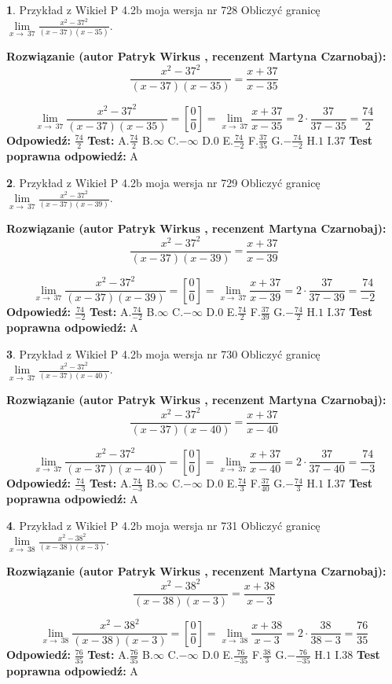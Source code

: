 \documentclass[12pt, a4paper]{article}
\theoremstyle{definition} %
\newtheorem{zad}{}
\newcommand{\zadStart}[1]{\begin{zad}#1\newline}
\newcommand{\zadStop}{\end{zad}}
\newcommand{\rozwStart}[2]{\noindent \textbf{Rozwiązanie (autor #1 , recenzent #2): }\newline}
\newcommand{\rozwStop}{\newline}
\newcommand{\odpStart}{\noindent \textbf{Odpowiedź:}\newline}
\newcommand{\odpStop}{\newline}
\newcommand{\testStart}{\noindent \textbf{Test:}\newline}
\newcommand{\testStop}{\newline}
\newcommand{\kluczStart}{\noindent \textbf{Test poprawna odpowiedź:}\newline}
\newcommand{\kluczStop}{\newline}
\begin{document}
\zadStart{Przykład z Wikieł P 4.2b moja wersja nr 728}
Obliczyć granicę $\lim\limits_{x\to\ 37}\frac{x^{2}-37^{2}}{(x-37)(x-35)}$.
\zadStop
\rozwStart{Patryk Wirkus}{Martyna Czarnobaj}
$$\frac{x^{2}-37^{2}}{(x-37)(x-35)}=\frac{x+37}{x-35}$$

$$\lim\limits_{x\to\ 37}\frac{x^{2}-37^{2}}{(x-37)(x-35)}=[\frac{0}{0}]=\lim\limits_{x\to\ 37}\frac{x+37}{x-35}=2 \cdot \frac{37}{37-35} = \frac{74}{2}$$
\rozwStop
\odpStart
$\frac{74}{2}$
\odpStop
\testStart
A.$\frac{74}{2}$
B.$\infty$
C.$-\infty$
D.$0$
E.$\frac{74}{-2}$
F.$\frac{37}{35}$
G.$-\frac{74}{-2}$
H.$1$
I.$37$
\testStop
\kluczStart
A
\kluczStop



\zadStart{Przykład z Wikieł P 4.2b moja wersja nr 729}
Obliczyć granicę $\lim\limits_{x\to\ 37}\frac{x^{2}-37^{2}}{(x-37)(x-39)}$.
\zadStop
\rozwStart{Patryk Wirkus}{Martyna Czarnobaj}
$$\frac{x^{2}-37^{2}}{(x-37)(x-39)}=\frac{x+37}{x-39}$$

$$\lim\limits_{x\to\ 37}\frac{x^{2}-37^{2}}{(x-37)(x-39)}=[\frac{0}{0}]=\lim\limits_{x\to\ 37}\frac{x+37}{x-39}=2 \cdot \frac{37}{37-39} = \frac{74}{-2}$$
\rozwStop
\odpStart
$\frac{74}{-2}$
\odpStop
\testStart
A.$\frac{74}{-2}$
B.$\infty$
C.$-\infty$
D.$0$
E.$\frac{74}{2}$
F.$\frac{37}{39}$
G.$-\frac{74}{2}$
H.$1$
I.$37$
\testStop
\kluczStart
A
\kluczStop



\zadStart{Przykład z Wikieł P 4.2b moja wersja nr 730}
Obliczyć granicę $\lim\limits_{x\to\ 37}\frac{x^{2}-37^{2}}{(x-37)(x-40)}$.
\zadStop
\rozwStart{Patryk Wirkus}{Martyna Czarnobaj}
$$\frac{x^{2}-37^{2}}{(x-37)(x-40)}=\frac{x+37}{x-40}$$

$$\lim\limits_{x\to\ 37}\frac{x^{2}-37^{2}}{(x-37)(x-40)}=[\frac{0}{0}]=\lim\limits_{x\to\ 37}\frac{x+37}{x-40}=2 \cdot \frac{37}{37-40} = \frac{74}{-3}$$
\rozwStop
\odpStart
$\frac{74}{-3}$
\odpStop
\testStart
A.$\frac{74}{-3}$
B.$\infty$
C.$-\infty$
D.$0$
E.$\frac{74}{3}$
F.$\frac{37}{40}$
G.$-\frac{74}{3}$
H.$1$
I.$37$
\testStop
\kluczStart
A
\kluczStop



\zadStart{Przykład z Wikieł P 4.2b moja wersja nr 731}
Obliczyć granicę $\lim\limits_{x\to\ 38}\frac{x^{2}-38^{2}}{(x-38)(x-3)}$.
\zadStop
\rozwStart{Patryk Wirkus}{Martyna Czarnobaj}
$$\frac{x^{2}-38^{2}}{(x-38)(x-3)}=\frac{x+38}{x-3}$$

$$\lim\limits_{x\to\ 38}\frac{x^{2}-38^{2}}{(x-38)(x-3)}=[\frac{0}{0}]=\lim\limits_{x\to\ 38}\frac{x+38}{x-3}=2 \cdot \frac{38}{38-3} = \frac{76}{35}$$
\rozwStop
\odpStart
$\frac{76}{35}$
\odpStop
\testStart
A.$\frac{76}{35}$
B.$\infty$
C.$-\infty$
D.$0$
E.$\frac{76}{-35}$
F.$\frac{38}{3}$
G.$-\frac{76}{-35}$
H.$1$
I.$38$
\testStop
\kluczStart
A
\kluczStop
\end{document}
